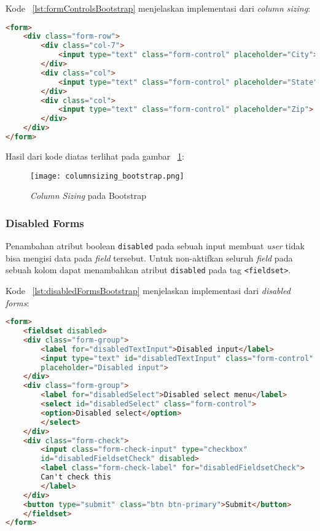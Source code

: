 Kode ~\ref{lst:formControlsBootstrap} menjelaskan implementasi dari \textit{column sizing}:
\begin{lstlisting}[style=customhtml, language=HTML,  basicstyle=\ttfamily, frame=single, columns=fullflexible, keepspaces=true, breaklines=true, showstringspaces=false, label={lst:columnsizingBootstrap}, caption=Column sizing pada bootstrap 4.] 
<form>
	<div class="form-row">
		<div class="col-7">
			<input type="text" class="form-control" placeholder="City">
		</div>
		<div class="col">
			<input type="text" class="form-control" placeholder="State">
		</div>
		<div class="col">
			<input type="text" class="form-control" placeholder="Zip">
		</div>
	</div>
</form>
\end{lstlisting}
\noindent Hasil dari kode diatas terlihat pada gambar ~\ref{fig:columnSizingBootstrap}:
\begin{figure} [H]
	\centering  
	\texttt{[image: columnsizing\_bootstrap.png]}  
	\caption{\textit{Column Sizing} pada Bootstrap} 
	\label{fig:columnSizingBootstrap}
\end{figure}
\subsubsection{Disabled Forms}
Penambahan atribut boolean \texttt{disabled} pada sebuah input membuat \textit{user} tidak bisa mengisi data pada \textit{field} tersebut. Untuk non-aktifkan seluruh \textit{field} pada sebuah kolom dapat menambahkan atribut \texttt{disabled} pada tag \texttt{<fieldset>}.

\noindent Kode ~\ref{lst:disabledFormsBootstrap} menjelaskan implementasi dari \textit{disabled forms}:
\begin{lstlisting}[style=customhtml, language=HTML,  basicstyle=\ttfamily, frame=single, columns=fullflexible, keepspaces=true, breaklines=true, showstringspaces=false, label={lst:disabledFormsBootstrap}, caption=Disabled forms pada bootstrap 4.]  
<form>
	<fieldset disabled>
	<div class="form-group">
		<label for="disabledTextInput">Disabled input</label>
		<input type="text" id="disabledTextInput" class="form-control"
		placeholder="Disabled input">
	</div>
	<div class="form-group">
		<label for="disabledSelect">Disabled select menu</label>
		<select id="disabledSelect" class="form-control">
		<option>Disabled select</option>
		</select>
	</div>
	<div class="form-check">
		<input class="form-check-input" type="checkbox" 
		id="disabledFieldsetCheck" disabled>
		<label class="form-check-label" for="disabledFieldsetCheck">
		Can't check this
		</label>
	</div>
	<button type="submit" class="btn btn-primary">Submit</button>
	</fieldset>
</form>
\end{lstlisting}

